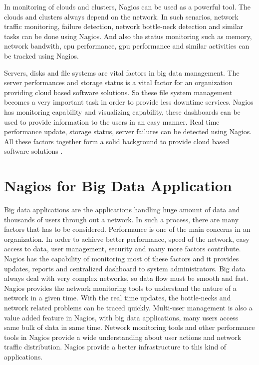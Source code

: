 \documentclass[9pt,twocolumn,twoside]{../../styles/osajnl}
\begin{document}
In monitoring of clouds and clusters, Nagios can be used as a powerful
tool. The clouds and clusters always depend on the network. In such
senarios, network traffic monitoring, failure detection, network
bottle-neck detection and similar tasks can be done using Nagios.
And also the status monitoring such as memory, network bandwith,
cpu performance, gpu performance and similar activities can be
tracked using Nagios. 

Servers, disks and file systems are vital factors in big data management.
The server performances and storage status is a vital factor for an
organization providing cloud based software solutions. So these file system
management becomes a very important task in order to provide less downtime
services. Nagios has monitoring capability and visualizing capability,
these dashboards can be used to provide information to the users in an easy
manner. Real time performance update, storage status, server failures can be
detected using Nagios. All these factors together form a solid background
to provide cloud based software solutions \cite{bigdata-nagios}.  

   
\section{Nagios for Big Data Application}

Big data applications are the applications handling huge amount of
data and thousands of users through out a network. In such a process,
there are many factors that has to be considered. Performance is
one of the main concerns in an organization. In order to achieve better
performance, speed of the network, easy access to data, user management,
security and many more factors contribute. Nagios has the capability of
monitoring most of these factors and it provides updates, reports and
centralized dashboard to system administrators. Big data always
deal with very complex networks, so data flow must be smooth and fast.
Nagios provides the network monitoring tools to understand the nature
of a network in a given time. With the real time updates, the bottle-necks
and network related problems can be traced quickly. Multi-user management
is also a value added feature in Nagios, with big data applications, many
users access same bulk of data in same time. Network monitoring tools and
other performance tools in Nagios provide a wide understanding about user
actions and network traffic distribution. Nagios provide a better infrastructure
to this kind of applications. 
\end{document}
